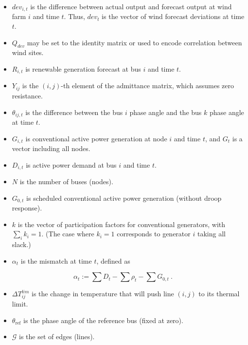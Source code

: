 \documentclass[conference]{IEEEtran}
\begin{document}
\begin{itemize}
\itemsep1pt\parskip0pt
\item $dev_{i,t}$ is the difference between actual output and forecast output at wind farm $i$ and time $t$. Thus, $dev_t$ is the vector of wind forecast deviations at time $t$.
\item $Q_{dev}$ may be set to the identity matrix or used to encode correlation between wind sites.
\item $R_{i,t}$ is renewable generation forecast at bus $i$ and time $t$.
\item $Y_{ij}$ is the $(i,j)$-th element of the admittance matrix, which assumes zero resistance.
\item $\theta_{ij,t}$ is the difference between the bus $i$ phase angle and the bus $k$ phase angle at time $t$.
\item $G_{i,t}$ is conventional active power generation at node $i$ and time $t$, and $G_t$ is a vector including all nodes.
\item $D_{i,t}$ is active power demand at bus $i$ and time $t$.
\item $N$ is the number of buses (nodes).
\item $G_{0,t}$ is scheduled conventional active power generation (without droop response).
\item $k$ is the vector of participation factors for conventional generators, with $\sum_i k_i = 1$. (The case where $k_i=1$ corresponds to generator $i$ taking all slack.)
\item $\alpha_t$ is the mismatch at time $t$, defined as
\end{itemize}
\[\alpha_t:= \sum D_t - \sum \rho_t - \sum G_{0,t} ~.\]

\begin{itemize}
\itemsep1pt\parskip0pt
\item $\Delta T_{ij}^{lim}$ is the change in temperature that will push line $(i,j)$ to its thermal limit.
\item $\theta_\text{ref}$ is the phase angle of the reference bus (fixed at zero).
\item $\mathcal{G}$ is the set of edges (lines).
\end{itemize}
\end{document}
